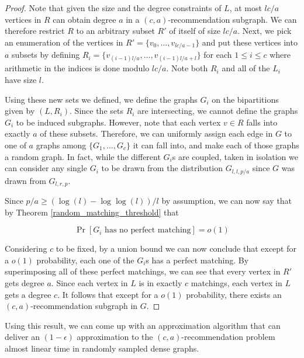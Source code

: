 \begin{proof}
Note that given the size and the degree constraints of $L$, at most $lc/a$ vertices in $R$ can obtain degree $a$ in a $(c,a)$-recommendation subgraph. We can therefore restrict $R$ to an arbitrary subset $R'$ of itself of size $lc/a$. Next, we pick an enumeration of the vertices in $R'=\{v_0,\ldots, v_{lc/a-1}\}$ and put these vertices into $a$ subsets by defining $R_i = \{v_{(i-1)l/a}, \ldots, v_{(i-1)l/a+l}\}$ for each $1\leq i\leq c$ where arithmetic in the indices is done modulo $lc/a$. Note both $R_i$ and all of the $L_i$ have size $l$. \vs

Using these new sets we defined, we define the graphs $G_i$ on the bipartitions given by $(L, R_i)$. Since the sets $R_i$ are intersecting, we cannot define the graphs $G_i$ to be induced subgraphs. However, note that each vertex $v\in R$ falls into exactly $a$ of these subsets. Therefore, we can uniformly assign each edge in $G$ to one of $a$ graphs among $\{G_1,\ldots, G_c\}$ it can fall into, and make each of those graphs a random graph. In fact, while the different $G_i$s are coupled, taken in isolation we can consider any single $G_i$ to be drawn from the distribution $G_{l,l,p/a}$ since $G$ was drawn from $G_{l,r,p}$. \vs

Since $p/a \geq (\log(l)-\log\log(l))/l$ by assumption, we can now say that by Theorem \ref{random_matching_threshold} that

\[ \Pr[\text{$G_i$ has no perfect matching}] = o(1) \]

Considering $c$ to be fixed, by a union bound we can now conclude that except for a $o(1)$ probability, each one of the $G_i$s has a perfect matching. By superimposing all of these perfect matchings, we can see that every vertex in $R'$ gets degree $a$. Since each vertex in $L$ is in exactly $c$ matchings, each vertex in $L$ gets a degree $c$. It follows that except for a $o(1)$ probability, there exists an $(c,a)$-recommendation subgraph in $G$.
\end{proof}

Using this result, we can come up with an approximation algorithm that can deliver an $(1-\epsilon)$ approximation to the $(c,a)$-recommendation problem almost linear time in randomly sampled dense graphs.

